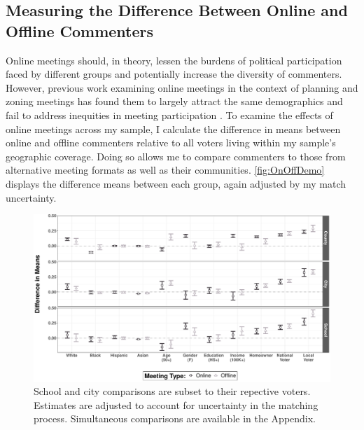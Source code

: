 \subsection{Measuring the Difference Between Online and Offline Commenters}

Online meetings should, in theory, lessen the burdens of political participation faced by different groups and potentially increase the diversity of commenters. However, previous work examining online meetings in the context of planning and zoning meetings has found them to largely attract the same demographics and fail to address inequities in meeting participation \citep{einsteinStillMutedLimited2022}. To examine the effects of online meetings across my sample, I calculate the difference in means between online and offline commenters relative to all voters living within my sample’s geographic coverage. Doing so allows me to compare commenters to those from alternative meeting formats as well as their communities. \autoref{fig:OnOffDemo} displays the difference means between each group, again adjusted by my match uncertainty.

\begin{figure}[H]
    \centering
     \par\medskip
    \includegraphics[scale=0.45]{Figures/OnOffDemoComparison.pdf}
    \caption[Difference Between Voters and Commenters By Meeting Format]{\footnotesize{School and city comparisons are subset to their repective  voters. Estimates are adjusted to account for uncertainty in the matching process. Simultaneous comparisons are available in the Appendix.}}
    \label{fig:OnOffDemo}
\end{figure}

